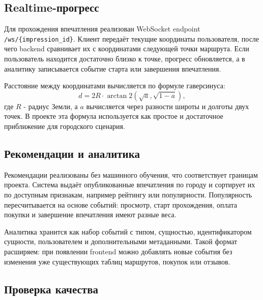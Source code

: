 \documentclass[a4paper,12pt]{extarticle}
\begin{document}
\subsection{Realtime-прогресс}

Для прохождения впечатления реализован WebSocket endpoint \texttt{/ws/\{impression\_id\}}. Клиент передаёт текущие координаты пользователя, после чего backend сравнивает их с координатами следующей точки маршрута. Если пользователь находится достаточно близко к точке, прогресс обновляется, а в аналитику записывается событие старта или завершения впечатления.

Расстояние между координатами вычисляется по формуле гаверсинуса:
\begin{equation}
	d = 2R \cdot \arctan2\left(\sqrt{a}, \sqrt{1-a}\right),
	\label{eq:haversine}
\end{equation}
где $R$ - радиус Земли, а $a$ вычисляется через разности широты и долготы двух точек. В проекте эта формула используется как простое и достаточное приближение для городского сценария.

\subsection{Рекомендации и аналитика}

Рекомендации реализованы без машинного обучения, что соответствует границам проекта. Система выдаёт опубликованные впечатления по городу и сортирует их по доступным признакам, например рейтингу или популярности. Популярность пересчитывается на основе событий: просмотр, старт прохождения, оплата покупки и завершение впечатления имеют разные веса.

Аналитика хранится как набор событий с типом, сущностью, идентификатором сущности, пользователем и дополнительными метаданными. Такой формат расширяем: при появлении frontend можно добавлять новые события без изменения уже существующих таблиц маршрутов, покупок или отзывов.

\subsection{Проверка качества}
\end{document}
